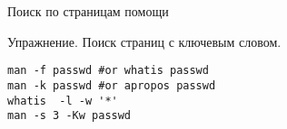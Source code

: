 \begin{frame}[fragile]{Поиск по страницам помощи}
     \begin{block}{Упражнение. Поиск страниц с ключевым словом.}
        \begin{lstlisting}
man -f passwd #or whatis passwd 
man -k passwd #or apropos passwd 
whatis  -l -w '*'
man -s 3 -Kw passwd
        \end{lstlisting}
    \end{block}
\end{frame}


